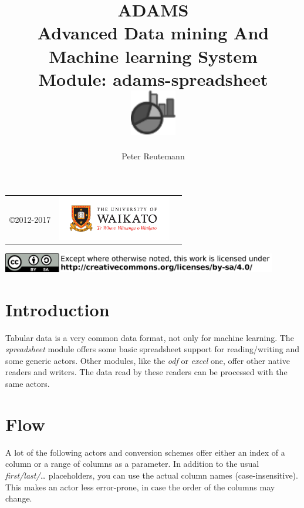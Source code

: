 \documentclass[a4paper]{book}
\title{
  \textbf{ADAMS} \\
  {\Large \textbf{A}dvanced \textbf{D}ata mining \textbf{A}nd \textbf{M}achine
  learning \textbf{S}ystem} \\
  {\Large Module: adams-spreadsheet} \\
  \vspace{1cm}
  \includegraphics[width=2cm]{images/spreadsheet-module.png} \\
}
\author{
  Peter Reutemann
}
\begin{document}
\begin{titlepage}
\maketitle

\thispagestyle{empty}
\center
\begin{table}[b]
	\begin{tabular}{c l l}
		\parbox[c][2cm]{2cm}{\copyright 2012-2017} &
		\parbox[c][2cm]{5cm}{\includegraphics[width=5cm]{images/coat_of_arms.pdf}} \\
	\end{tabular}
	\includegraphics[width=12cm]{images/cc.png} \\
\end{table}

\end{titlepage}

\tableofcontents
\listoffigures


\chapter{Introduction}
Tabular data is a very common data format, not only for machine learning.
The \textit{spreadsheet} module offers some basic spreadsheet support for
reading/writing and some generic actors. Other modules, like the \textit{odf}
or \textit{excel} one, offer other native readers and writers. The data
read by these readers can be processed with the same actors.


\chapter{Flow}
A lot of the following actors and conversion schemes offer either an index of
a column or a range of columns as a parameter. In addition to the usual
\textit{first/last/\ldots} placeholders, you can use the actual column names
(case-insensitive). This makes an actor less error-prone, in case the order 
of the columns may change.
\end{document}

